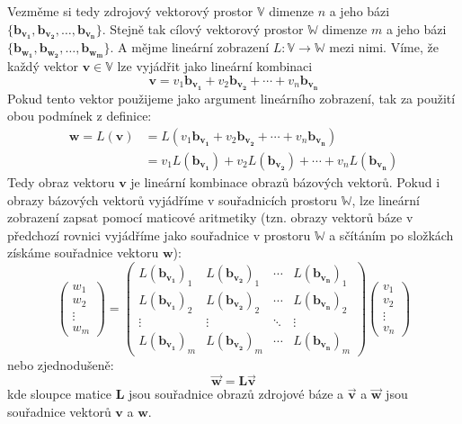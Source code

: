 \documentclass[a5paper,12pt]{amsbook}
\theoremstyle{definition}
\newcommand{\myscalar}[1]{#1}
\newcommand{\myvec}[1]{\mathbf{#1}}
\newcommand{\mycoord}[1]{\overrightarrow{\mathbf{#1}}}
\newcommand{\mymatrix}[1]{\mathbf{#1}}
\newcommand{\myspace}[1]{\mathbb{#1}}
\newcommand{\mymap}[1]{#1}
\begin{document}
Vezměme si tedy zdrojový vektorový prostor $\myspace{V}$ dimenze $n$ a jeho bázi 
$\{\myvec{b_{v_1}},\myvec{b_{v_2}},\ldots,\myvec{b_{v_n}}\}$. Stejně tak cílový
vektorový prostor $\myspace{W}$ dimenze $m$ a jeho bázi $\{\myvec{b_{w_1}}, \myvec{b_{w_2}},
\ldots,\myvec{b_{w_m}}\}$. A mějme lineární zobrazení $\mymap{L}: \myspace{V}\rightarrow\myspace{W}$
mezi nimi. Víme, že každý vektor $\myvec{v}\in\myspace{V}$ lze vyjádřit jako lineární kombinaci
\begin{equation*}
\myvec{v}=\myscalar{v_{1}}\myvec{b_{v_1}}+\myscalar{v_{2}}\myvec{b_{v_2}}+\cdots+\myscalar{v_{n}}
  \myvec{b_{v_n}}
\end{equation*} 
Pokud tento vektor použijeme jako argument lineárního zobrazení, tak za použití obou podmínek
z definice:
\begin{equation*}
\begin{split}
\myvec{w}=L(\myvec{v})&=\mymap{L}(\myscalar{v_{1}}\myvec{b_{v_1}}+\myscalar{v_{2}}\myvec{b_{v_2}}
    +\cdots+\myscalar{v_{n}}\myvec{b_{v_n}})\\
  &=\myscalar{v_{1}}\mymap{L}(\myvec{b_{v_1}})+\myscalar{v_{2}}\mymap{L}(\myvec{b_{v_2}})+\cdots
    +\myscalar{v_{n}}\mymap{L}(\myvec{b_{v_n}})
\end{split}
\end{equation*} 
Tedy obraz vektoru $\myvec{v}$ je lineární kombinace obrazů bázových vektorů.
Pokud i obrazy bázových vektorů vyjádříme v souřadnicích prostoru $\myspace{W}$, lze lineární
zobrazení zapsat pomocí maticové aritmetiky (tzn. obrazy vektorů báze v předchozí rovnici
vyjádříme jako souřadnice v prostoru $\myspace{W}$ a sčítáním po složkách získáme souřadnice
vektoru $\myvec{w}$):
\begin{equation*}
\left(\begin{array}{c}
w_{1}\\
w_{2}\\
\vdots\\
w_{m}
\end{array}\right)=\left(\begin{array}{cccc}
\mymap{L}(\myvec{b_{v_1}})_1 & \mymap{L}(\myvec{b_{v_2}})_1 & \cdots & \mymap{L}(\myvec{b_{v_n}})_1\\
\mymap{L}(\myvec{b_{v_1}})_2 & \mymap{L}(\myvec{b_{v_2}})_2 & \cdots & \mymap{L}(\myvec{b_{v_n}})_2\\
\vdots & \vdots & \ddots & \vdots\\
\mymap{L}(\myvec{b_{v_1}})_m & \mymap{L}(\myvec{b_{v_2}})_m & \cdots & \mymap{L}(\myvec{b_{v_n}})_m
\end{array}\right)\left(\begin{array}{c}
v_{1}\\
v_{2}\\
\vdots\\
v_{n}
\end{array}\right)
\end{equation*}
nebo zjednodušeně:
\begin{equation*}
\mycoord{w}=\mymatrix{L}\mycoord{v}
\end{equation*}
kde sloupce matice $\mymatrix{L}$ jsou souřadnice obrazů zdrojové báze a $\mycoord{v}$
a $\mycoord{w}$ jsou souřadnice vektorů $\myvec{v}$ a $\myvec{w}$.
\end{document}
